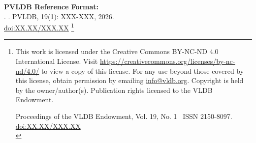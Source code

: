 \documentclass[sigconf,nonacm]{acmart}
\newcommand\vldbdoi{XX.XX/XXX.XX}
\newcommand\vldbpages{XXX-XXX}
\newcommand\vldbvolume{19}
\newcommand\vldbissue{1}
\newcommand\vldbyear{2026}
\newcommand\vldbauthors{\authors}
\newcommand\vldbtitle{\shorttitle}
\newcommand\vldbpagestyle{plain}
\begin{document}
\pagestyle{\vldbpagestyle}
\begingroup\small\noindent\raggedright\textbf{PVLDB Reference Format:}\\
\vldbauthors. \vldbtitle. PVLDB, \vldbvolume(\vldbissue): \vldbpages, \vldbyear.\\
\href{https://doi.org/\vldbdoi}{doi:\vldbdoi}
\endgroup
\begingroup
\renewcommand\thefootnote{}\footnote{\noindent
This work is licensed under the Creative Commons BY-NC-ND 4.0 International License. Visit \url{https://creativecommons.org/licenses/by-nc-nd/4.0/} to view a copy of this license. For any use beyond those covered by this license, obtain permission by emailing \href{mailto:info@vldb.org}{info@vldb.org}. Copyright is held by the owner/author(s). Publication rights licensed to the VLDB Endowment. \\
\raggedright Proceedings of the VLDB Endowment, Vol. \vldbvolume, No. \vldbissue\ %
ISSN 2150-8097. \\
\href{https://doi.org/\vldbdoi}{doi:\vldbdoi} \\
}\addtocounter{footnote}{-1}\endgroup










\newcommand{\zhou}[1]{\textcolor{magenta}{[zhou: #1]}}











    

\clearpage

   
\balance



\newpage
\appendix

\end{document}
